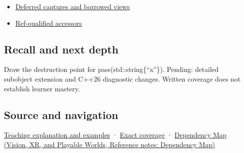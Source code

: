 \hypertarget{appendix-a978b29bbbb0-used-by}{}

\begin{itemize}
\tightlist
\item
  \hyperref[appendix-aea529eb5175]{Deferred captures and borrowed views}
\item
  \hyperref[appendix-d42039b1d6f7]{Ref-qualified accessors}
\end{itemize}

\subsection{Recall and next depth}\label{appendix-a978b29bbbb0-recall-and-next-depth}

\hypertarget{appendix-a978b29bbbb0-recall-and-next-depth}{}

Draw the destruction point for pass(std::string\{``x''\}). Pending: detailed subobject extension and C++26 diagnostic changes. Written coverage does not establish learner mastery.

\subsection{Source and navigation}\label{appendix-a978b29bbbb0-source-and-navigation}

\hypertarget{appendix-a978b29bbbb0-source-and-navigation}{}

\hyperref[01-foundations-i-ch003-a-temporary-needs-an-explicit-lifetime-story]{Teaching explanation and examples} · \hyperref[appendix-fd090d982a15-m008---parts-113-126]{Exact coverage} · \href{../07-Vision-XR-and-Playable-Worlds/main.pdf\#nameddest=appendix-4ad47bdd269a}{Dependency Map (Vision, XR, and Playable Worlds, Reference notes: Dependency Map)}

